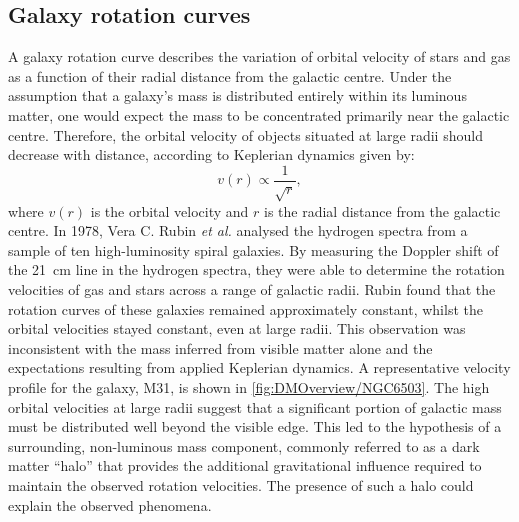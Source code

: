 \subsection{Galaxy rotation curves}\label{sec:DMOverview/RotationCurves}
A galaxy rotation curve describes the variation of orbital velocity of stars and gas as a function of their radial distance from the galactic centre. Under the assumption that a galaxy's mass is distributed entirely within its luminous matter, one would expect the mass to be concentrated primarily near the galactic centre. Therefore, the orbital velocity of objects situated at large radii should decrease with distance, according to Keplerian dynamics given by:
\begin{equation}
v(r) \propto \frac{1}{\sqrt{r}},
\end{equation}
where $v(r)$ is the orbital velocity and $r$ is the radial distance from the galactic centre.
In 1978, Vera C. Rubin \textit{et al.}\cite{Rubin} analysed the hydrogen spectra from a sample of ten high-luminosity spiral galaxies. By measuring the Doppler shift of the 21~cm line in the hydrogen spectra, they were able to determine the rotation velocities of gas and stars across a range of galactic radii. Rubin found that the rotation curves of these galaxies remained approximately constant, whilst the orbital velocities stayed constant, even at large radii. This observation was inconsistent with the mass inferred from visible matter alone and the expectations resulting from applied Keplerian dynamics.
A representative velocity profile for the galaxy, M31, is shown in \autoref{fig:DMOverview/NGC6503}. The high orbital velocities at large radii suggest that a significant portion of galactic mass must be distributed well beyond the visible edge. This led to the hypothesis of a surrounding, non-luminous mass component, commonly referred to as a dark matter ``halo'' that provides the additional gravitational influence required to maintain the observed rotation velocities. The presence of such a halo could explain the observed phenomena.
